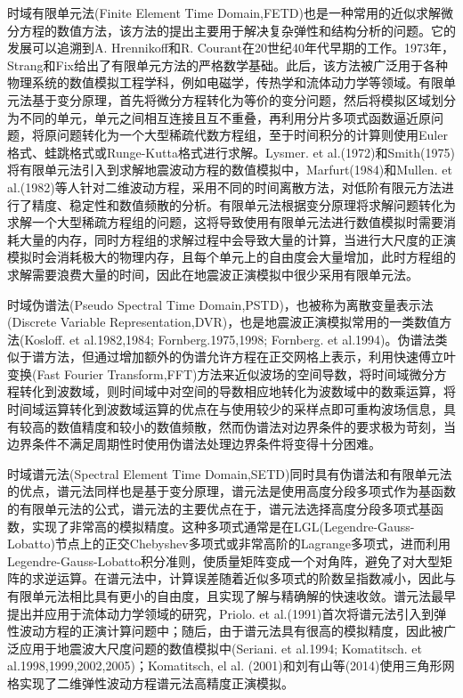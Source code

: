 \documentclass[12pt]{article}
\newcommand{\upcite}[1]{\textsuperscript{\textsuperscript{\cite{#1}}}}
\begin{document}
时域有限单元法(Finite Element Time Domain,FETD)也是一种常用的近似求解微分方程的数值方法，该方法的提出主要用于解决复杂弹性和结构分析的问题。它的发展可以追溯到A. Hrennikoff和R. Courant在20世纪40年代早期的工作\upcite{Hrennikoff1941,Courant1943}。1973年，Strang和Fix给出了有限单元方法的严格数学基础\upcite{Strang1973}。此后，该方法被广泛用于各种物理系统的数值模拟工程学科，例如电磁学，传热学和流体动力学等领域\upcite{Zienkiewicz2005,Bathe2006}。有限单元法基于变分原理，首先将微分方程转化为等价的变分问题，然后将模拟区域划分为不同的单元，单元之间相互连接且互不重叠，再利用分片多项式函数逼近原问题，将原问题转化为一个大型稀疏代数方程组，至于时间积分的计算则使用Euler格式、蛙跳格式或Runge-Kutta格式进行求解。Lysmer. et al.(1972)和Smith(1975)将有限单元法引入到求解地震波动方程的数值模拟中\upcite{Lysmer1972,Smith1975}，Marfurt(1984)和Mullen. et al.(1982)等人针对二维波动方程，采用不同的时间离散方法，对低阶有限元方法进行了精度、稳定性和数值频散的分析\upcite{Marfurt1984,Mullen1982}。有限单元法根据变分原理将求解问题转化为求解一个大型稀疏方程组的问题，这将导致使用有限单元法进行数值模拟时需要消耗大量的内存，同时方程组的求解过程中会导致大量的计算，当进行大尺度的正演模拟时会消耗极大的物理内存，且每个单元上的自由度会大量增加，此时方程组的求解需要浪费大量的时间，因此在地震波正演模拟中很少采用有限单元法。
\par
时域伪谱法(Pseudo Spectral Time Domain,PSTD)，也被称为离散变量表示法(Discrete Variable Representation,DVR)，也是地震波正演模拟常用的一类数值方法(Kosloff. et al.1982,1984; Fornberg.1975,1998; Fornberg. et al.1994)。伪谱法类似于谱方法，但通过增加额外的伪谱允许方程在正交网格上表示，利用快速傅立叶变换(Fast Fourier Transform,FFT)方法来近似波场的空间导数，将时间域微分方程转化到波数域，则时间域中对空间的导数相应地转化为波数域中的数乘运算\upcite{Kosloff1982,Kosloff1984,Fornberg1975,Fornberg1998,Fornberg1994}，将时间域运算转化到波数域运算的优点在与使用较少的采样点即可重构波场信息，具有较高的数值精度和较小的数值频散，然而伪谱法对边界条件的要求极为苛刻，当边界条件不满足周期性时使用伪谱法处理边界条件将变得十分困难。
\par
时域谱元法(Spectral Element Time Domain,SETD)同时具有伪谱法和有限单元法的优点，谱元法同样也是基于变分原理，谱元法是使用高度分段多项式作为基函数的有限单元法的公式，谱元法的主要优点在于，谱元法选择高度分段多项式基函数，实现了非常高的模拟精度。这种多项式通常是在LGL(Legendre-Gauss-Lobatto)节点上的正交Chebyshev多项式或非常高阶的Lagrange多项式，进而利用Legendre-Gauss-Lobatto积分准则，使质量矩阵变成一个对角阵，避免了对大型矩阵的求逆运算。在谱元法中，计算误差随着近似多项式的阶数呈指数减小，因此与有限单元法相比具有更小的自由度，且实现了解与精确解的快速收敛。谱元法最早提出并应用于流体动力学领域的研究，Priolo. et al.(1991)首次将谱元法引入到弹性波动方程的正演计算问题中\upcite{Priolo1991}；随后，由于谱元法具有很高的模拟精度，因此被广泛应用于地震波大尺度问题的数值模拟中(Seriani. et al.1994; Komatitsch. et al.1998,1999,2002,2005)\upcite{Seriani1994,Komatitsch1998,Komatitsch1999,Komatitsch2002,Komatitsch2005}；Komatitsch, el al. (2001)和刘有山等(2014)使用三角形网格实现了二维弹性波动方程谱元法高精度正演模拟\upcite{Komatitsch2001,LiuYoushan2014}。
\end{document}
